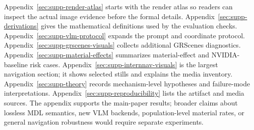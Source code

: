 Appendix~\ref{sec:supp-render-atlas} starts with the render atlas
so readers can inspect the actual image evidence before the formal details.
Appendix~\ref{sec:supp-derivations} gives the mathematical definitions used by
the evaluation checks. Appendix~\ref{sec:supp-vlm-protocol} expands the prompt and
coordinate protocol. Appendix~\ref{sec:supp-grscenes-visuals} collects
additional GRScenes diagnostics. Appendix~\ref{sec:supp-material-effects}
summarizes material-effect and NVIDIA-baseline risk cases.
Appendix~\ref{sec:supp-internnav-visuals} is the largest navigation section; it
shows selected stills and explains the media inventory.
Appendix~\ref{sec:supp-theory} records mechanism-level hypotheses and
failure-mode interpretations. Appendix~\ref{sec:supp-reproducibility} lists the
artifact and media sources. The appendix supports the main-paper results;
broader claims about lossless MDL semantics, new VLM backends,
population-level material rates, or general navigation robustness would require
separate experiments.
